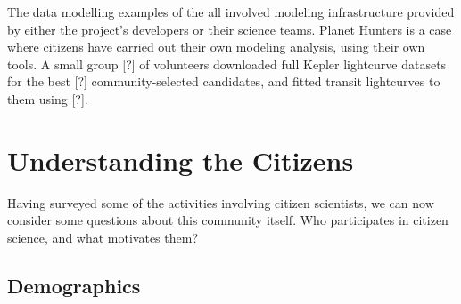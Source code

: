 \documentclass{ar2e}
\begin{document}

% 
%

  The data modelling
examples of the  all involved modeling infrastructure provided
by either the project's developers or their science teams. Planet Hunters is a
case where citizens have carried out their own modeling analysis, using their
own tools. A small group [?] of volunteers downloaded full Kepler lightcurve
datasets for the best [?] community-selected candidates, and fitted transit
lightcurves to them using [?]. 



% 


\newpage


\section{Understanding the Citizens}
\label{sec:crowd}

Having surveyed some of the activities involving citizen scientists, we can
now consider some questions about this community itself. Who participates in
citizen science, and what motivates them?



\subsection{Demographics}
\label{sec:crowd:demographics}
\end{document}
